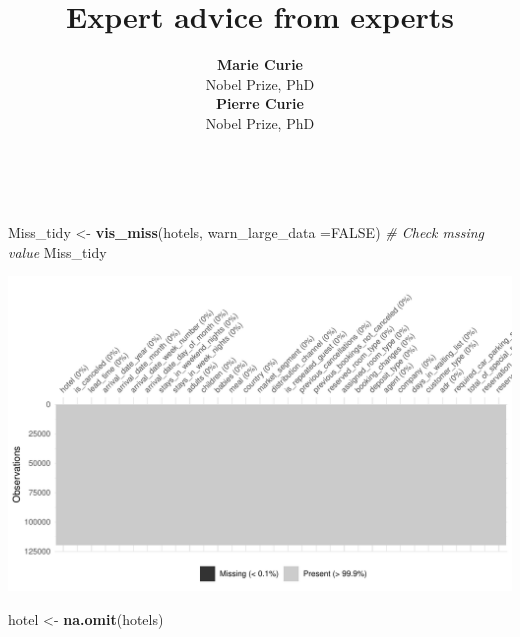 \documentclass[11pt,a4paper,]{article}
\title{Expert advice from experts}
\author{\sf\Large\textbf{ Marie Curie}\\ {\sf\large Nobel Prize, PhD\\[0.5cm]} \sf\Large\textbf{ Pierre Curie}\\ {\sf\large Nobel Prize, PhD\\[0.5cm]}}
\date{\sf\Date~\Month~\Year}
\makeatletter
\newenvironment{Shaded}{\begin{snugshade}}{\end{snugshade}}
\newcommand{\CommentTok}[1]{\textcolor[rgb]{0.56,0.35,0.01}{\textit{#1}}}
\newcommand{\DataTypeTok}[1]{\textcolor[rgb]{0.13,0.29,0.53}{#1}}
\newcommand{\KeywordTok}[1]{\textcolor[rgb]{0.13,0.29,0.53}{\textbf{#1}}}
\newcommand{\NormalTok}[1]{#1}
\newcommand{\OtherTok}[1]{\textcolor[rgb]{0.56,0.35,0.01}{#1}}
\newcommand{\StringTok}[1]{\textcolor[rgb]{0.31,0.60,0.02}{#1}}
\def\titlepage{\front{\expandafter{\@title}}{\@author}{\@organization}}
\makeatother
\begin{document}
\titlepage

\begin{Shaded}
\begin{Highlighting}[]
\NormalTok{Miss\_tidy \textless{}{-}}\StringTok{ }\KeywordTok{vis\_miss}\NormalTok{(hotels, }\DataTypeTok{warn\_large\_data =}\OtherTok{FALSE}\NormalTok{) }\CommentTok{\# Check mssing value }
\NormalTok{Miss\_tidy}
\end{Highlighting}
\end{Shaded}

\includegraphics{tidy_files/figure-latex/check NA-1.pdf}

\begin{Shaded}
\begin{Highlighting}[]
\NormalTok{hotel \textless{}{-}}\StringTok{ }\KeywordTok{na.omit}\NormalTok{(hotels)}
\end{Highlighting}
\end{Shaded}
\end{document}
